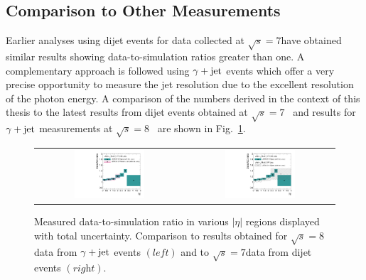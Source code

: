 \subsection{Comparison to Other Measurements}
\label{subsec:jer_results_comparison}
Earlier analyses using dijet events for data collected at $\sqrt{s}=7$\tev have obtained similar results showing data-to-simulation ratios greater than one. A complementary approach is followed using $\gamma +\rm{jet}$ events which offer a very precise opportunity to measure the jet resolution due to the excellent resolution of the photon energy. A comparison of the numbers derived in the context of this thesis to the latest results from dijet events obtained at $\sqrt{s}=7$\tev~\cite{thesis:Schroeder} and results for $\gamma +\rm{jet}$ measurements at $\sqrt{s}=8$\tev~\cite{CMS-AN-2013-179} are shown in Fig.~\ref{fig:result_comparison}.
\begin{figure}[!t]
  \centering
  \begin{tabular}{cc}
                \includegraphics[width=0.49\textwidth]{figures/JER_2012_compPhoton_final_combination_v1.pdf} &
                \includegraphics[width=0.49\textwidth]{figures/JER_2012_comp2011_final_combination_v1.pdf}
  \end{tabular}
  \caption{Measured data-to-simulation ratio in various $|\eta|$ regions displayed with total uncertainty. Comparison to results obtained for $\sqrt{s}=8$\tev data from $\gamma +\rm{jet}$ events $(\textit{left})$ and to $\sqrt{s}=7$\tev data from dijet events $(\textit{right})$.}
  \label{fig:result_comparison}
\end{figure}
